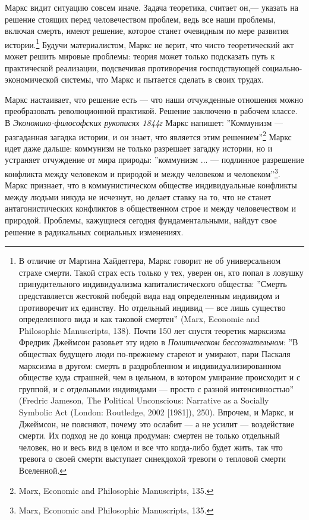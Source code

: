 \documentclass[12pt]{book}
\begin{document}
Маркс видит ситуацию совсем иначе. Задача теоретика, считает он,--- указать на решение стоящих перед человечеством проблем, ведь все наши проблемы, включая смерть, имеют решение, которое станет очевидным по мере развития истории.\footnote{В отличие от Мартина Хайдеггера, Маркс говорит не об универсальном страхе смерти. Такой страх есть только у тех, уверен он, кто попал в ловушку принудительного индивидуализма капиталистического общества: ''Смерть представляется жестокой победой вида над определенным индивидом и противоречит их единству. Но отдельный индивид --- все лишь существо определенного вида и как таковой смертен'' (Marx, Economic and Philosophic Manuscripts, 138). Почти 150 лет спустя теоретик марксизма Фредрик Джеймсон разовьет эту идею в \textit{Политическом бессознательном}: ''В обществах будущего люди по-прежнему стареют и умирают, пари Паскаля марксизма в другом: смерть в раздробленном и индивидуализированном обществе куда страшней, чем в цельном, в котором умирание происходит и с группой, и с отдельными индивидами --- просто с разной интенсивностью'' (Fredric Jameson, The Political Unconscious: Narrative as a Socially Symbolic Act (London: Routledge, 2002 [1981]), 250). Впрочем, и Маркс, и Джеймсон, не поясняют, почему это ослабит --- а не усилит --- воздействие смерти. Их подход не до конца продуман: смертен не только отдельный человек, но и весь вид в целом и все что когда-либо будет жить, так что тревога о своей смерти выступает синекдохой тревоги о тепловой смерти Вселенной.} Будучи материалистом, Маркс не верит, что чисто теоретический акт может решить мировые проблемы: теория может только подсказать путь к практической реализации, подсвечивая противоречия господствующей социально-экономической системы, что Маркс и пытается сделать в своих трудах.

Маркс настаивает, что решение есть --- что наши отчужденные отношения можно преобразовать революционной практикой. Решение заключено в рабочем классе. В \textit{Экономико-философских рукописях 1844г} Маркс напишет: ''Коммунизм --- разгаданная загадка истории, и он знает, что является этим решением''\footnote{Marx, Economic and Philosophic Manuscripts, 135.} Маркс идет даже дальше: коммунизм не только разрешает загадку истории, но и устраняет отчуждение от мира природы: ''коммунизм ... --- подлинное разрешение конфликта между человеком и природой и между человеком и человеком''\footnote{Marx, Economic and Philosophic Manuscripts, 135.}. Маркс признает, что в коммунистическом обществе индивидуальные конфликты между людьми никуда не исчезнут, но делает ставку на то, что не станет антагонистических конфликтов в общественном строе и между человечеством и природой. Проблемы, кажущиеся сегодня фундаментальными, найдут свое решение в радикальных социальных изменениях.
\end{document}
